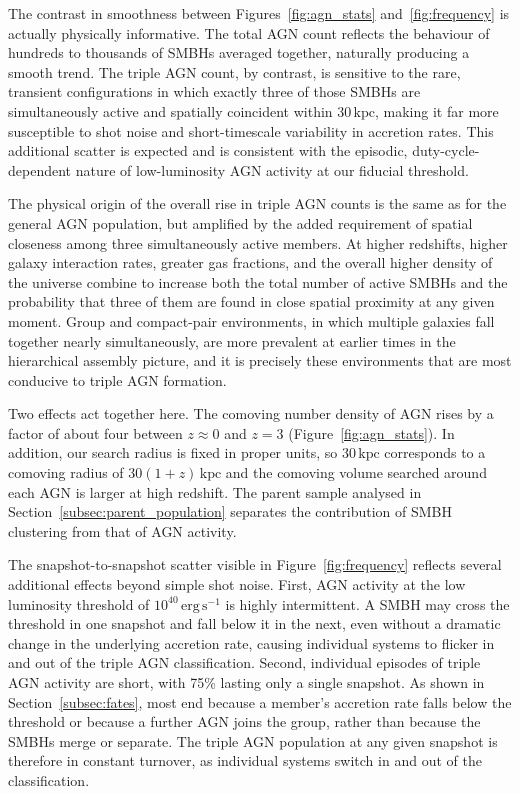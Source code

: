\documentclass[twocolumn, 10pt]{article}
\begin{document}
The contrast in smoothness between Figures~\ref{fig:agn_stats} and~\ref{fig:frequency} is actually physically informative. The total AGN count reflects the behaviour of hundreds to thousands of SMBHs averaged together, naturally producing a smooth trend. The triple AGN count, by contrast, is sensitive to the rare, transient configurations in which exactly three of those SMBHs are simultaneously active and spatially coincident within $30\,\mathrm{kpc}$, making it far more susceptible to shot noise and short-timescale variability in accretion rates. This additional scatter is expected and is consistent with the episodic, duty-cycle-dependent nature of low-luminosity AGN activity at our fiducial threshold.
 
The physical origin of the overall rise in triple AGN counts is the same as for the general AGN population, but amplified by the added requirement of spatial closeness among three simultaneously active members. At higher redshifts, higher galaxy interaction rates, greater gas fractions, and the overall higher density of the universe combine to increase both the total number of active SMBHs and the probability that three of them are found in close spatial proximity at any given moment. Group and compact-pair environments, in which multiple galaxies fall together nearly simultaneously, are more prevalent at earlier times in the hierarchical assembly picture, and it is precisely these environments that are most conducive to triple AGN formation.
 
Two effects act together here. The comoving number density of AGN rises by a factor of about four between $z \approx 0$ and $z = 3$ (Figure~\ref{fig:agn_stats}). In addition, our search radius is fixed in proper units, so $30\,\mathrm{kpc}$ corresponds to a comoving radius of $30(1+z)\,\mathrm{kpc}$ and the comoving volume searched around each AGN is larger at high redshift. The parent sample analysed in Section~\ref{subsec:parent_population} separates the contribution of SMBH clustering from that of AGN activity.
 
The snapshot-to-snapshot scatter visible in Figure~\ref{fig:frequency} reflects several additional effects beyond simple shot noise. First, AGN activity at the low luminosity threshold of $10^{40}\,\mathrm{erg\,s^{-1}}$ is highly intermittent. A SMBH may cross the threshold in one snapshot and fall below it in the next, even without a dramatic change in the underlying accretion rate, causing individual systems to flicker in and out of the triple AGN classification. Second, individual episodes of triple AGN activity are short, with 75\% lasting only a single snapshot. As shown in Section~\ref{subsec:fates}, most end because a member's accretion rate falls below the threshold or because a further AGN joins the group, rather than because the SMBHs merge or separate. The triple AGN population at any given snapshot is therefore in constant turnover, as individual systems switch in and out of the classification.
 
\end{document}
